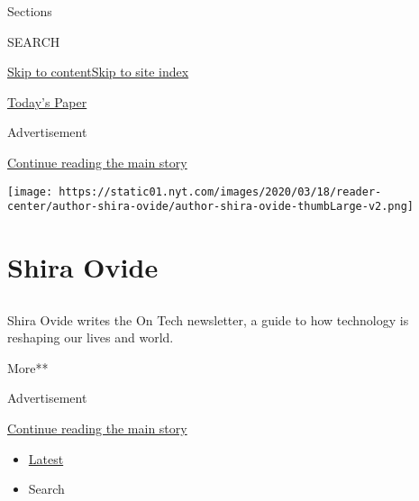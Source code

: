 Sections

SEARCH

\protect\hyperlink{site-content}{Skip to
content}\protect\hyperlink{site-index}{Skip to site index}

\href{https://myaccount.nytimes.com/auth/login?response_type=cookie\&client_id=vi}{}

\href{https://www.nytimes.com/section/todayspaper}{Today's Paper}

Advertisement

\protect\hyperlink{after-top}{Continue reading the main story}

\texttt{[image: https://static01.nyt.com/images/2020/03/18/reader-center/author-shira-ovide/author-shira-ovide-thumbLarge-v2.png]}

\hypertarget{shira-ovide}{%
\section{Shira Ovide}\label{shira-ovide}}

\hypertarget{section}{%
\subsection{}\label{section}}

Shira Ovide writes the On Tech newsletter, a guide to how technology is
reshaping our lives and world.

More**

Advertisement

\protect\hyperlink{after-mid1}{Continue reading the main story}

\begin{itemize}
\tightlist
\item
  \protect\hyperlink{stream-panel}{Latest}
\item
  Search
\end{itemize}

